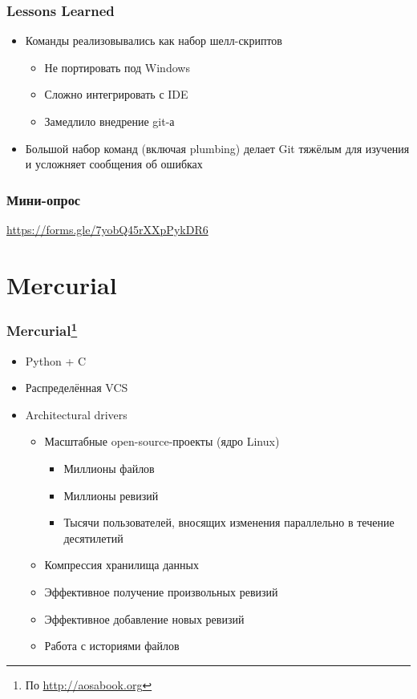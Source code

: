 \documentclass[xetex,mathserif,serif]{beamer}
\begin{document}
	\begin{frame}
		\frametitle{Lessons Learned}
		\begin{itemize}
			\item Команды реализовывались как набор шелл-скриптов
			\begin{itemize}
				\item Не портировать под Windows
				\item Сложно интегрировать с IDE
				\item Замедлило внедрение git-а
			\end{itemize}
			\item Большой набор команд (включая plumbing) делает Git тяжёлым для изучения и усложняет сообщения об ошибках
		\end{itemize}
	\end{frame}

	\begin{frame}
		\frametitle{Мини-опрос}
		\begin{center}
			\url{https://forms.gle/7yobQ45rXXpPykDR6}
		\end{center}
	\end{frame}

	\section{Mercurial}

	\begin{frame}
		\frametitle{Mercurial\footnote{\tiny{По \url{http://aosabook.org}}}}
		\begin{itemize}
			\item Python + C
			\item Распределённая VCS
			\item Architectural drivers
			\begin{itemize}
				\item Масштабные open-source-проекты (ядро Linux)
				\begin{itemize}
					\item Миллионы файлов
					\item Миллионы ревизий
					\item Тысячи пользователей, вносящих изменения параллельно в течение десятилетий
				\end{itemize}
				\item Компрессия хранилища данных
				\item Эффективное получение произвольных ревизий
				\item Эффективное добавление новых ревизий
				\item Работа с историями файлов
			\end{itemize}
		\end{itemize}
	\end{frame}
\end{document}
